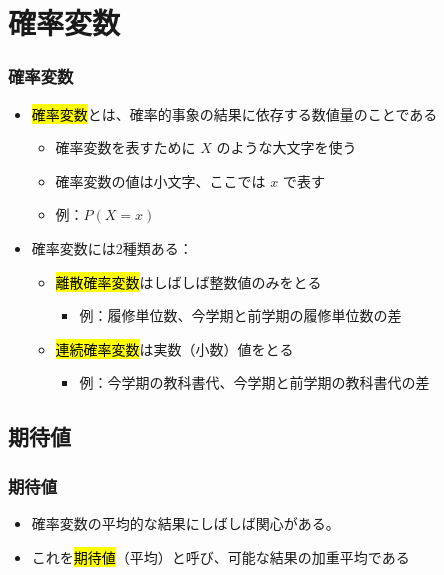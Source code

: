 
\section{確率変数}


\begin{frame}
\frametitle{確率変数}

\begin{itemize}

\item \hl{確率変数}とは、確率的事象の結果に依存する数値量のことである
\begin{itemize}
\item 確率変数を表すために $X$ のような大文字を使う
\item 確率変数の値は小文字、ここでは $x$ で表す
\item 例：$P(X = x)$
\end{itemize}

\item 確率変数には2種類ある：
\begin{itemize}
\item \hl{離散確率変数}はしばしば整数値のみをとる
\begin{itemize}
\item 例：履修単位数、今学期と前学期の履修単位数の差
\end{itemize}
\item \hl{連続確率変数}は実数（小数）値をとる
\begin{itemize}
\item 例：今学期の教科書代、今学期と前学期の教科書代の差
\end{itemize}
\end{itemize}

\end{itemize}

\end{frame}


\subsection{期待値}


\begin{frame}
\frametitle{期待値}

\begin{itemize}

\item 確率変数の平均的な結果にしばしば関心がある。

\item これを\hl{期待値}（平均）と呼び、可能な結果の加重平均である
\formula{\[\mu = E(X) = \sum_{i = 1}^k x_i ~ P(X = x_i)\]}

\end{itemize}

\end{frame}

